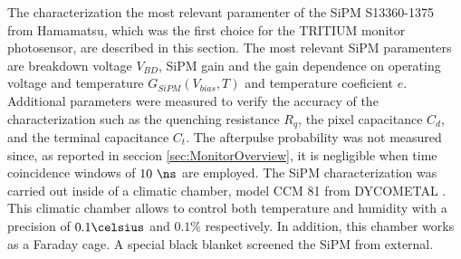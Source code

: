 The characterization the most relevant paramenter of the SiPM S13360-1375 from Hamamatsu, which was the first choice for the TRITIUM monitor photosensor, are described in this section. The most relevant SiPM paramenters are breakdown voltage $V_{BD}$, SiPM gain and the gain dependence on operating voltage and temperature $G_{SiPM}(V_{bias}, T)$ and temperature coeficient $e$. Additional parameters were measured to verify the accuracy of the characterization such as the quenching resistance $R_q$, the pixel capacitance $C_d$, and the terminal capacitance $C_t$. The afterpulse probability was not measured since, as reported in seccion \ref{sec:MonitorOverview}, it is negligible when time coincidence windows of $10~\ns$ are employed. The SiPM characterization was carried out inside of a climatic chamber, model CCM 81 from DYCOMETAL \cite{ClimaticChamberIFIMED}. This climatic chamber allows to control both temperature and humidity with a precision of $0.1\celsius$ and $0.1\%$ respectively. In addition, this chamber works as a Faraday cage. A special black blanket \cite{BlackBlancket} screened the SiPM from external. 

